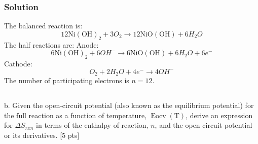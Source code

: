\documentclass[12pt]{article}
\begin{document}
\subsubsection{Solution}
The balanced reaction is:
\begin{equation}
    12\mathrm{Ni}(\mathrm{OH})_{2} + 3O_2 \rightarrow 12\mathrm{NiO}(\mathrm{OH}) + 6H_2O 
\end{equation}
The half reactions are:
Anode:
\begin{equation}
    6\mathrm{Ni}(\mathrm{OH})_{2} + 6OH^- \rightarrow 6\mathrm{NiO}(\mathrm{OH}) + 6H_2O + 6e^-
\end{equation}
Cathode:
\begin{equation}
    O_2 + 2H_2O + 4e^- \rightarrow 4OH^-
\end{equation}
The number of participating electrons is $n=12$.
\subsection{}
b. Given the open-circuit potential (also known as the equilibrium potential) for the full reaction as a function of temperature, $\operatorname{Eocv}(\mathrm{T})$, derive an expression for $\Delta S_{r x n}$ in terms of the enthalpy of reaction, $n$, and the open circuit potential or its derivatives. [5 pts]\\[0pt]
\end{document}
